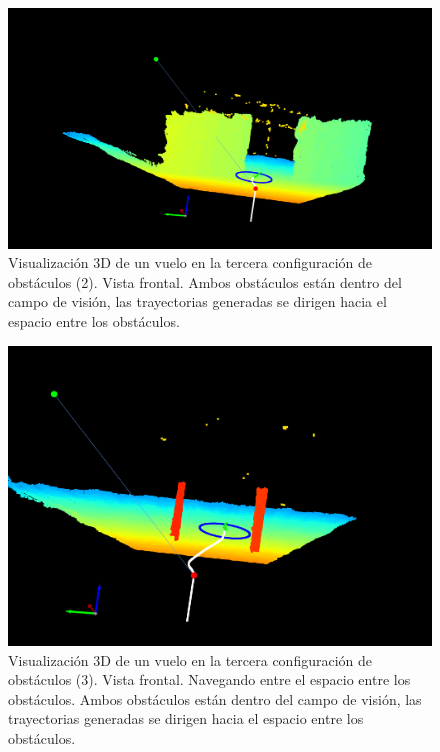 \begin{figure}[H]
    \centering
    \includegraphics[scale=0.25]{partes/img/depth-parallel-2-front.png}
    \caption[Visualización 3D de un vuelo en la tercera configuración de obstáculos (2). Vista frontal.]{Visualización 3D de un vuelo en la tercera configuración de obstáculos (2). Vista frontal. Ambos obstáculos están dentro del campo de visión, las trayectorias generadas se dirigen hacia el espacio entre los obstáculos.}
    \label{fig:depth-parallel-2}
\end{figure}

\begin{figure}[H]
    \centering
    \includegraphics[scale=0.32]{partes/img/depth-parallel-4-front-red.png}
    \caption[Visualización 3D de un vuelo en la tercera configuración de obstáculos (3). Vista frontal. Navegando entre el espacio entre los obstáculos.]{Visualización 3D de un vuelo en la tercera configuración de obstáculos (3). Vista frontal. Navegando entre el espacio entre los obstáculos. Ambos obstáculos están dentro del campo de visión, las trayectorias generadas se dirigen hacia el espacio entre los obstáculos.}
    \label{fig:depth-parallel-4}
\end{figure}

